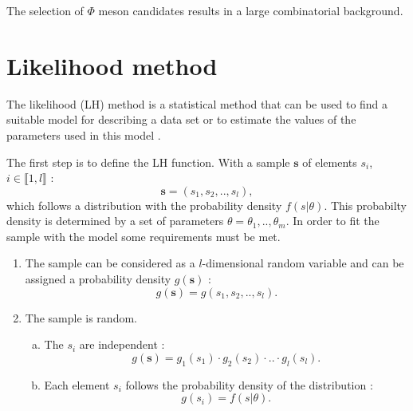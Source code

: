 The selection of $\Phi$ meson candidates results in a large combinatorial background.

\section{Likelihood method}

The likelihood (LH) method is a statistical method that can be used to find a suitable model for describing a data set or to estimate the values of the parameters used in this model \cite{LH1,LH2}.

The first step is to define the LH function. With a sample $\mathbf{s}$ of elements $s_i$, $i \in \llbracket 1,l \rrbracket$ :
%
\begin{equation}
  \mathbf{s} = \left( s_1,s_2,..,s_l \right),
\end{equation}
%
which follows a distribution with the probability density $f(s|\theta)$. This probabilty density is determined by a set of parameters $\theta = \theta_1,..,\theta_m$. In order to fit the sample with the model some requirements must be met.

\begin{enumerate}
  \item The sample can be considered as a $l$-dimensional random variable and can be assigned a probability density $g(\mathbf{s})$ :
  \begin{equation}
    g(\mathbf{s}) = g\left( s_1,s_2,..,s_l \right).
  \end{equation}
  \item The sample is random.
  \begin{enumerate}[(a)]
    \item The $s_i$ are independent :
    \begin{equation}
      g(\mathbf{s}) = g_1\left(s_1 \right) \cdot g_2\left(s_2 \right) \cdot .. \cdot g_l\left(s_l \right).
    \end{equation}
    \item Each element $s_i$ follows the probability density of the distribution :
    \begin{equation}
      g(s_i) = f(s|\theta).
    \end{equation}
  \end{enumerate}
\end{enumerate}

